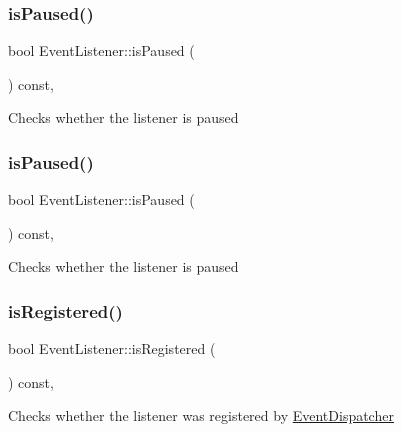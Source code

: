\subsubsection{\texorpdfstring{is\+Paused()}{isPaused()}\hspace{0.1cm}{\footnotesize\ttfamily [1/2]}}
{\footnotesize\ttfamily bool Event\+Listener\+::is\+Paused (\begin{DoxyParamCaption}{ }\end{DoxyParamCaption}) const\hspace{0.3cm}{\ttfamily [inline]}, {\ttfamily [protected]}}

Checks whether the listener is paused \mbox{\label{classEventListener_a4ea8de9a3aec84b0239fe7f4b104f53c}} 
\subsubsection{\texorpdfstring{is\+Paused()}{isPaused()}\hspace{0.1cm}{\footnotesize\ttfamily [2/2]}}
{\footnotesize\ttfamily bool Event\+Listener\+::is\+Paused (\begin{DoxyParamCaption}{ }\end{DoxyParamCaption}) const\hspace{0.3cm}{\ttfamily [inline]}, {\ttfamily [protected]}}

Checks whether the listener is paused \mbox{\label{classEventListener_a01d25b75d01ebd4abbb6e5083a087df5}} 
\subsubsection{\texorpdfstring{is\+Registered()}{isRegistered()}\hspace{0.1cm}{\footnotesize\ttfamily [1/2]}}
{\footnotesize\ttfamily bool Event\+Listener\+::is\+Registered (\begin{DoxyParamCaption}{ }\end{DoxyParamCaption}) const\hspace{0.3cm}{\ttfamily [inline]}, {\ttfamily [protected]}}

Checks whether the listener was registered by \hyperlink{classEventDispatcher}{Event\+Dispatcher} \mbox{\label{classEventListener_a01d25b75d01ebd4abbb6e5083a087df5}} 
